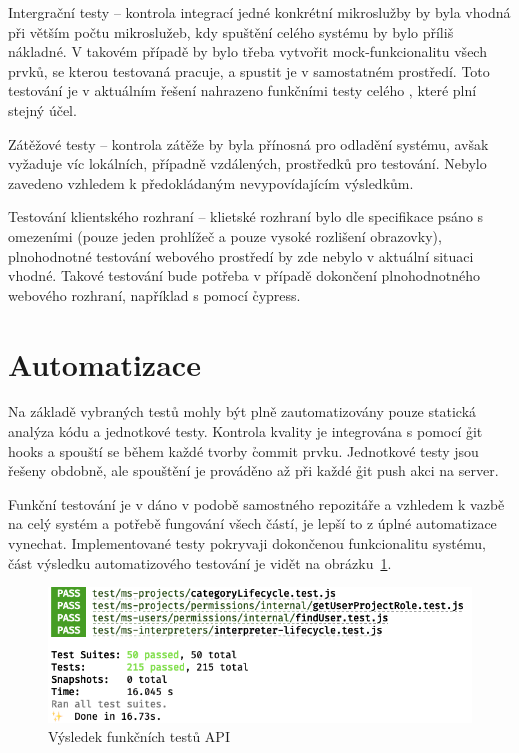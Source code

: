\begin{dl}
   \item[Intergrační testy \g{MS}] – kontrola integrací jedné konkrétní mikroslužby by byla vhodná při větším počtu mikroslužeb, kdy spuštění celého systému by bylo příliš nákladné.
   V takovém případě by bylo třeba vytvořit mock-funkcionalitu všech prvků, se kterou testovaná  pracuje, a spustit je v samostatném prostředí.
   Toto testování je v aktuálním řešení nahrazeno funkčními testy celého , které plní stejný účel.
   \item[Zátěžové testy] – kontrola zátěže by byla přínosná pro odladění systému, avšak vyžaduje víc lokálních, případně vzdálených, prostředků pro testování.
   Nebylo zavedeno vzhledem k předokládaným nevypovídajícím výsledkům.
   \item[Testování klientského rozhraní] – klietské rozhraní bylo dle specifikace psáno s omezeními (pouze jeden prohlížeč a pouze vysoké rozlišení obrazovky), plnohodnotné testování webového prostředí by zde nebylo v aktuální situaci vhodné.
   Takové testování bude potřeba v případě dokončení plnohodnotného webového rozhraní, například s pomocí \h{cypress}.
\end{dl}



\section{Automatizace}\label{sec:automatization}

Na základě vybraných testů mohly být plně zautomatizovány pouze statická analýza kódu a jednotkové testy.
Kontrola kvality je integrována s pomocí \h{git hooks} a spouští se během každé tvorby \h{commit} prvku.
Jednotkové testy jsou řešeny obdobně, ale spouštění je prováděno až při každé \h{git push} akci na server.

Funkční testování je v dáno v podobě samostného repozitáře a vzhledem k vazbě na celý systém a potřebě fungování všech částí, je lepší to z úplné automatizace vynechat.
Implementované testy pokryvaji dokončenou funkcionalitu systému, část výsledku automatizového testování je vidět na obrázku~\ref{fig:int-test}.


\begin{figure}[htbp]
   \centering
   \includegraphics[max width=\textwidth]{assets/testing}
   \caption{Výsledek funkčních testů API}\label{fig:int-test}
\end{figure}
